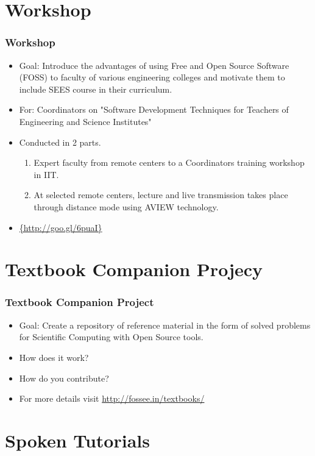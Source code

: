 \documentclass{beamer}
\begin{document}
\section{Workshop}

\begin{frame}
  \frametitle{Workshop}
  \begin{itemize}
  \item Goal: Introduce the advantages of using Free and Open Source Software (FOSS) to faculty of various engineering colleges and motivate them to include SEES course in their curriculum.
  \item For: Coordinators on "Software Development Techniques for Teachers of Engineering and Science Institutes"
  \item Conducted in 2 parts.
  \begin{enumerate}
  \item Expert faculty from remote centers to a Coordinators training workshop in IIT.
  \item At selected remote centers, lecture and live transmission takes place through distance mode using AVIEW technology. 
  \end{enumerate}
  \item \url{{http://goo.gl/6puaI}}
  \end{itemize}
\end{frame}


\section{Textbook Companion Projecy}

\begin{frame}	
	\frametitle{Textbook Companion Project}
	\begin{itemize}
	\item Goal: Create a repository of reference material in the form of solved problems for Scientific Computing with Open Source tools.
	\item How does it work?
	\item How do you contribute?
	\item For more details visit {\url{http://fossee.in/textbooks/}}
	\end{itemize}
\end{frame}

\section{Spoken Tutorials}
\end{document}
